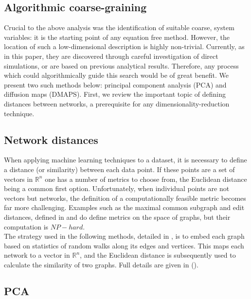 \documentclass[12pt]{article}
\begin{document}
\begin{onehalfspace}
\section{Algorithmic coarse-graining}
\label{sec:dr}
Crucial to the above analysis was the identification of suitable coarse, system variables: it is the starting point of any equation free method. However, the location of such a low-dimensional description is highly non-trivial. Currently, as in this paper, they are discovered through careful investigation of direct simulations, or are based on previous analytical results. Therefore, any process which could algorithmically guide this search would be of great benefit. We present two such methods below: principal component analysis (PCA) and diffusion maps (DMAPS). First, we review the important topic of defining distances between networks, a prerequisite for any dimensionality-reduction technique.

\subsection{Network distances}

When applying machine learning techniques to a dataset, it is necessary to define a distance (or similarity) between each data point. If these points are a set of vectors in $\mathbb{R}^n$ one has a number of metrics to choose from, the Euclidean distance being a common first option. Unfortunately, when individual points are not vectors but networks, the definition of a computationally feasible metric becomes far more challenging. Examples such as the maximal common subgraph and edit distances, defined in \cite{bunke_graph_1998} and \cite{gao_survey_2010} do define metrics on the space of graphs, but their computation is $NP-hard$. \\

The strategy used in the following methods, detailed in \cite{rajendran_analysis_2013}, is to embed each graph based on statistics of random walks along its edges and vertices. This maps each network to a vector in $\mathbb{R}^n$, and the Euclidean distance is subsequently used to calculate the similarity of two graphs. Full details are given in (\cite{rajendran_analysis_2013}).

\subsection{PCA}



\end{onehalfspace}
\end{document}

